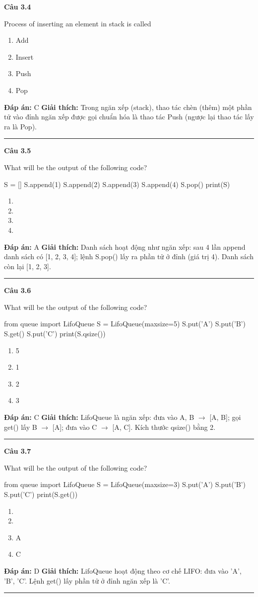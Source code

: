 \documentclass[11pt,a4paper]{article}
\newenvironment{question}[1]{%
  \par\vspace{1em}\noindent\textbf{\large Câu #1}\par\vspace{0.4em}
}{%
  \par\vspace{1em}\hrule\vspace{0.6em}
}
\newenvironment{choices}{%
  \begin{enumerate}[label=\textbf{\Alph*.},leftmargin=2.2em,itemsep=2pt,topsep=3pt]
}{%
  \end{enumerate}
}
\newcommand{\choice}{\item}
\newenvironment{codebox}{%
  \begin{tcolorbox}[colback=gray!8!white,colframe=gray!50!black,arc=1.5mm,boxrule=0.6pt,left=3mm,right=3mm,top=2.5mm,bottom=2.5mm]
  \ttfamily\small
}{%
  \end{tcolorbox}
}
\begin{document}
\begin{question}{3.4}
Process of inserting an element in stack is called
\begin{choices}
\choice Add
\choice Insert
\choice Push
\choice Pop
\end{choices}
\textbf{Đáp án:} C
\textbf{Giải thích:} Trong ngăn xếp (stack), thao tác chèn (thêm) một phần tử vào đỉnh ngăn xếp được gọi chuẩn hóa là thao tác Push (ngược lại thao tác lấy ra là Pop).
\end{question}

\begin{question}{3.5}
What will be the output of the following code?
\begin{codebox}
S = []
S.append(1)
S.append(2)
S.append(3)
S.append(4)
S.pop()
print(S)
\end{codebox}
\begin{choices}
\choice [1, 2, 3]
\choice [2, 3, 4]
\choice [4]
\choice [1]
\end{choices}
\textbf{Đáp án:} A
\textbf{Giải thích:} Danh sách hoạt động như ngăn xếp: sau 4 lần append danh sách có [1, 2, 3, 4]; lệnh S.pop() lấy ra phần tử ở đỉnh (giá trị 4). Danh sách còn lại [1, 2, 3].
\end{question}

\begin{question}{3.6}
What will be the output of the following code?
\begin{codebox}
from queue import LifoQueue
S = LifoQueue(maxsize=5)
S.put('A')
S.put('B')
S.get()
S.put('C')
print(S.qsize())
\end{codebox}
\begin{choices}
\choice 5
\choice 1
\choice 2
\choice 3
\end{choices}
\textbf{Đáp án:} C
\textbf{Giải thích:} LifoQueue là ngăn xếp: đưa vào A, B \(\to\) [A, B]; gọi get() lấy B \(\to\) [A]; đưa vào C \(\to\) [A, C]. Kích thước qsize() bằng 2.
\end{question}

\begin{question}{3.7}
What will be the output of the following code?
\begin{codebox}
from queue import LifoQueue
S = LifoQueue(maxsize=3)
S.put('A')
S.put('B')
S.put('C')
print(S.get())
\end{codebox}
\begin{choices}
\choice ['A', 'B', 'C']
\choice ['C', 'B', 'A']
\choice A
\choice C
\end{choices}
\textbf{Đáp án:} D
\textbf{Giải thích:} LifoQueue hoạt động theo cơ chế LIFO: đưa vào 'A', 'B', 'C'. Lệnh get() lấy phần tử ở đỉnh ngăn xếp là 'C'.
\end{question}
\end{document}
